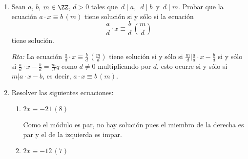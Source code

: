 \documentclass[12pt,spanish,makeidx]{amsbook}
\newcommand{\rta}{\noindent\textit{Rta: }}
\newcommand{\md}[1]{{\,}\left(#1\right)}
\begin{document}
\begin{enumerate}
\begin{enumerate}
		\item $x^4  \equiv1\md{16}$\quad
		
		\rta Notemos que $x$ debe ser impar. Podemos tomar $-8\le x\le 8$, es decir $x\in \{-7, -5,-3, -1, 1, 3, 5, 7\}$.
		Los cuadrados son $\{49, 25, 9, 1, 1,9, 25, 49\}$ que son congruentes módulo 16 a $\{1, 9, 9, 1, 1, 9, 9,1\}$
		A su vez cuando elevamos estos al cuadrado, como $9^2=81\equiv 1\md{16}$ Tenemos que todo número impar es solución de la ecuación.
		
		Alternativamente podríamos elevar $2k+1$ a la cuarta con la f\'ormula binomial $\sum_{j=0}^4 \binom{4}{j}(2k)^j1^{4-j}=1+4\cdot 2k+6\cdot4k^2+4\cdot4k^3+16k^4= 1+8(k+3k^2)+16(k^3+k^4)\equiv 1+8(k+3k^2)\md{16}$.
		Si observamos que $k(1+3k)$ siempre es par ya que es uno de los factores es par, tenemos que 
		$(2k+1)^4\equiv 1+ 16(3k+1)k/2\equiv 1\md{16}$.
		
		\item $3x  \equiv 1 \md{5}$
		
		\rta Probamos con $x=0,1,2,3,4$ y vemos que $3\cdot2=6\equiv 1\md{5}$. Luego las soluciones son $x=5k+2$.
	\end{enumerate}
	
	\item Sean $a$, $b$, $m \in {\ZZ}$, $d>0$ tales que  \,$d\mid a$,\,  \,$d\mid b$\, y \,$d\mid m$. Probar que la ecuación $a\cdot x \equiv b\,( m)$ tiene 	solución si y sólo si la ecuación
	\begin{equation*}
		\frac{a}{d}\cdot x \equiv \frac{b}{d}\md{\frac{m}{d}}
	\end{equation*}
	tiene solución.
		
	\rta La ecuación $\frac{a}{d}\cdot x \equiv \frac{b}{d} \md{\frac{m}{d}}$
	tiene solución si y sólo si $\frac{m}{d}\vert \frac{a}{d}\cdot x - \frac{b}{d}$ si y sólo si $\frac{a}{d}\cdot x - \frac{b}{d}=\frac{m}{d}q$ como $d\neq0$ multiplicando por $d$, esto ocurre si y sólo si $m\vert a \cdot x - b $, es decir, $a \cdot x \equiv b \md{m}$.
	
	\smallskip
	
	\item Resolver las siguientes ecuaciones:
	\begin{enumerate}
		\item $2x \equiv -21 \md{8}$ 
		
		Como el módulo es par, no hay solución pues el miembro de la derecha es par y el de la izquierda es impar.
		
		\item $2x \equiv -12 \md{7} $
		

\end{enumerate}
\end{enumerate}
\end{document}

